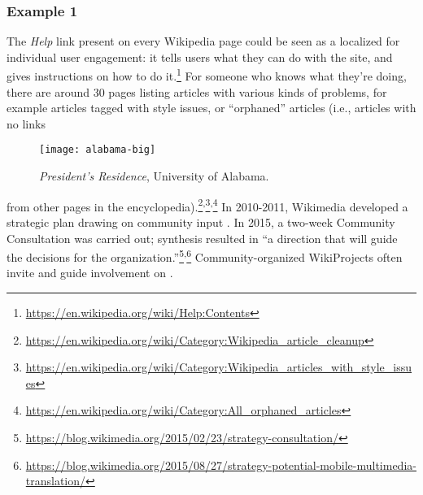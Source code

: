 \subsubsection*{Example 1}  The \emph{Help} link present on every Wikipedia page could be seen as a
localized  for individual user
engagement: it tells users what they can do with the site, and gives instructions on how to do it.\footnote{\url{https://en.wikipedia.org/wiki/Help:Contents}}
For someone who knows what they're doing, there are
around 30 pages listing articles with various kinds of problems, for
example articles tagged with style issues, or ``orphaned'' articles
(i.e., articles with no links
\begin{wrapfigure}{r}{.32\textwidth}
\vspace{-.3cm}
{\centering
\texttt{[image: alabama-big]}

\par}
\vspace{-.2cm}
\captionsetup{font=footnotesize,width=.3\textwidth}
\caption{\textsl{President's Residence}, University of Alabama.
\label{presidents-home}}
\vspace{-.8cm}
\end{wrapfigure}
 from other pages in the
encyclopedia).\footnote{\url{https://en.wikipedia.org/wiki/Category:Wikipedia_article_cleanup}}\textsuperscript{,}\footnote{\url{https://en.wikipedia.org/wiki/Category:Wikipedia_articles_with_style_issues}}\textsuperscript{,}\footnote{\url{https://en.wikipedia.org/wiki/Category:All_orphaned_articles}}
%
%
In 2010-2011, Wikimedia
 developed
a strategic plan drawing 
on community input \cite{wikimedia2011plan}.
  In 2015, a two-week 
Community Consultation was carried out; synthesis resulted in ``a direction that will guide the decisions for the organization.''\footnote{\url{https://blog.wikimedia.org/2015/02/23/strategy-consultation/}}\textsuperscript{,}\footnote{\url{https://blog.wikimedia.org/2015/08/27/strategy-potential-mobile-multimedia-translation/}}
%
%
 Community-organized WikiProjects often invite and guide involvement
 on .




